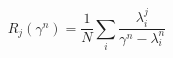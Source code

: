 \begin{equation}
R_j(\gamma^n) = \frac 1 N \sum_i\frac{\lambda_i^{j}}{\gamma^n-\lambda_i^n}
\end{equation}

